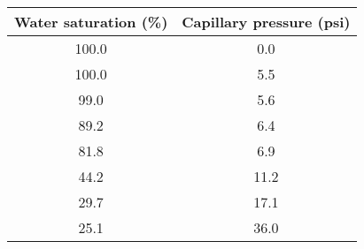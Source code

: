 \begin{tabular}[12pt]{|c|c|}
\hline
\textbf{Water saturation (\%)}&\textbf{Capillary pressure (psi)}\\
\hline
100.0&0.0\\
\hline
100.0&5.5\\
\hline
99.0&5.6\\
\hline
89.2&6.4\\
\hline
81.8&6.9\\
\hline
44.2&11.2\\
\hline
29.7&17.1\\
\hline
25.1&36.0\\
\hline
\end{tabular}